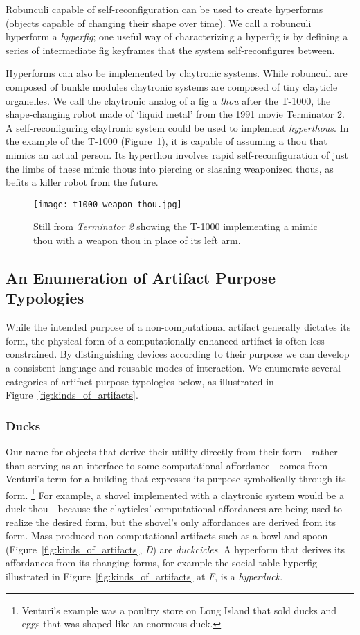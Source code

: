 Robunculi capable of self-reconfiguration can be used to create hyperforms (objects capable of changing their shape over time). We call a robunculi hyperform a \emph{hyperfig}; one useful way of characterizing a hyperfig is by defining a series of intermediate fig keyframes that the system self-reconfigures between. 

Hyperforms can also be implemented by claytronic systems. While robunculi are composed of bunkle modules claytronic systems are composed of tiny clayticle organelles. We call the claytronic analog of a fig a \emph{thou} after the T-1000, the shape-changing robot made of `liquid metal' from the 1991 movie Terminator 2. A self-reconfiguring claytronic system could be used to implement \emph{hyperthous}. In the example of the T-1000 (Figure~\ref{fig:t1000_weapon_thou}), it is capable of assuming a thou that mimics an actual person. Its hyperthou involves rapid self-reconfiguration of just the limbs of these mimic thous into piercing or slashing weaponized thous, as befits a killer robot from the future. 

\begin{figure}[]
  \centering
    \texttt{[image: t1000\_weapon\_thou.jpg]}
  \caption{Still from \emph{Terminator 2} showing the T-1000 implementing a mimic thou with a weapon thou in place of its left arm.}
  \label{fig:t1000_weapon_thou}
\end{figure}

\subsection{An Enumeration of Artifact Purpose Typologies} %
%
While the intended purpose of a non-computational artifact generally dictates its form, the physical form of a computationally enhanced artifact is often less constrained. 
By distinguishing devices according to their purpose we can develop a consistent language and reusable modes of interaction. 
We enumerate several categories of artifact purpose typologies below, as illustrated in Figure~\ref{fig:kinds_of_artifacts}. 

\subsubsection{Ducks}
Our name for objects that derive their utility directly from their form---rather than serving as an interface to some computational affordance---comes from Venturi's term \citeyearpar{venturi_vegas} for a building that expresses its purpose symbolically through its form.%
\footnote{Venturi's example was a poultry store on Long Island that sold ducks and eggs that was shaped like an enormous duck.}
For example, a shovel implemented with a claytronic system would be a duck thou---because the clayticles' computational affordances are being used to realize the desired form, but the shovel's only affordances are derived from its form. 
Mass-produced non-computational artifacts such as a bowl and spoon (Figure~\ref{fig:kinds_of_artifacts}, \emph{D}) are \emph{duckcicles}. 
A hyperform that derives its affordances from its changing forms, for example the social table hyperfig illustrated in Figure~\ref{fig:kinds_of_artifacts} at \emph{F}, is a \emph{hyperduck}.

